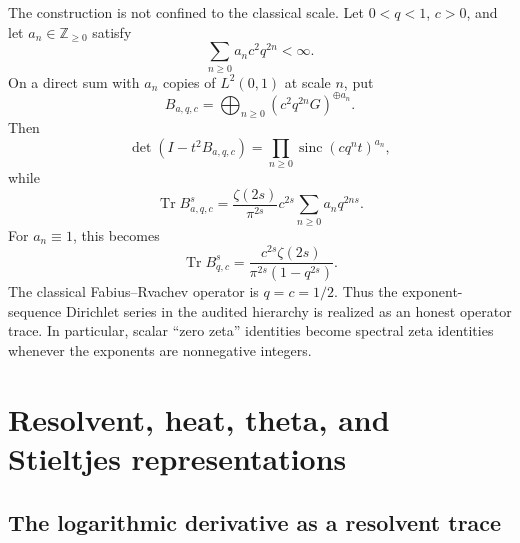 \documentclass[11pt,oneside]{article}
\theoremstyle{definition}
\newcommand{\Z}{\mathbb Z}
\newcommand{\sinc}{\operatorname{sinc}}
\newcommand{\Tr}{\operatorname{Tr}}
\begin{document}
The construction is not confined to the classical scale.  Let \(0<q<1\), \(c>0\), and
let \(a_n\in\Z_{\ge0}\) satisfy
\begin{equation}
 \sum_{n\ge0}a_n c^2q^{2n}<\infty.
 \label{eq:exp-summability}
\end{equation}
On a direct sum with \(a_n\) copies of \(L^2(0,1)\) at scale \(n\), put
\begin{equation}
 B_{a,q,c}=\bigoplus_{n\ge0}
 \left(c^2q^{2n}G\right)^{\oplus a_n}.
 \label{eq:general-B}
\end{equation}
Then
\begin{equation}
 \det(I-t^2B_{a,q,c})
 =\prod_{n\ge0}\sinc(cq^nt)^{a_n},
 \label{eq:general-det}
\end{equation}
while
\begin{equation}
 \Tr B_{a,q,c}^{s}
 =\frac{\zeta(2s)}{\pi^{2s}}c^{2s}
 \sum_{n\ge0}a_nq^{2ns}.
 \label{eq:general-zeta}
\end{equation}
For \(a_n\equiv1\), this becomes
\begin{equation}
 \Tr B_{q,c}^{s}
 =\frac{c^{2s}\zeta(2s)}{\pi^{2s}(1-q^{2s})}.
 \label{eq:q-geometric-zeta}
\end{equation}
The classical Fabius--Rvachev operator is \(q=c=1/2\).  Thus the exponent-sequence
Dirichlet series in the audited hierarchy is realized as an honest operator trace.  In
particular, scalar ``zero zeta'' identities become spectral zeta identities whenever
the exponents are nonnegative integers.

\section{Resolvent, heat, theta, and Stieltjes representations}
\label{sec:heat}

\subsection{The logarithmic derivative as a resolvent trace}
\end{document}
